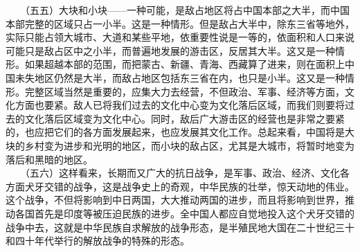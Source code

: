\documentclass[cn,11pt,chinese]{elegantbook}
\begin{document}
　　（五五）大块和小块——一种可能，是敌占地区将占中国本部之大半，而中国本部完整的区域只占一小半。这是一种情形。但是敌占大半中，除东三省等地外，实际只能占领大城市、大道和某些平地，依重要性说是一等的，依面积和人口来说可能只是敌占区中之小半，而普遍地发展的游击区，反居其大半。这又是一种情形。如果超越本部的范围，而把蒙古、新疆、青海、西藏算了进来，则在面积上中国未失地区仍然是大半，而敌占地区包括东三省在内，也只是小半。这又是一种情形。完整区域当然是重要的，应集大力去经营，不但政治、军事、经济等方面，文化方面也要紧。敌人已将我们过去的文化中心变为文化落后区域，而我们则要将过去的文化落后区域变为文化中心。同时，敌后广大游击区的经营也是非常之要紧的，也应把它们的各方面发展起来，也应发展其文化工作。总起来看，中国将是大块的乡村变为进步和光明的地区，而小块的敌占区，尤其是大城市，将暂时地变为落后和黑暗的地区。\\
　　（五六）这样看来，长期而又广大的抗日战争，是军事、政治、经济、文化各方面犬牙交错的战争，这是战争史上的奇观，中华民族的壮举，惊天动地的伟业。这个战争，不但将影响到中日两国，大大推动两国的进步，而且将影响到世界，推动各国首先是印度等被压迫民族的进步。全中国人都应自觉地投入这个犬牙交错的战争中去，这就是中华民族自求解放的战争形态，是半殖民地大国在二十世纪三十和四十年代举行的解放战争的特殊的形态。\\
\end{document}
